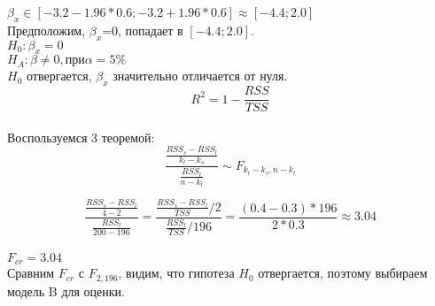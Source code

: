 \documentclass[12pt]{article} %
\theoremstyle{definition} %
\begin{document}
$\beta_x \in [-3.2 - 1.96*0.6; -3.2 + 1.96*0.6] \approx [-4.4;2.0]$\\
Предположим, $\beta_x$=0, попадает в $[-4.4;2.0]$.\\
$H_0:\beta_x=0$\\
$H_A:\beta \neq 0, при \alpha=5\%$\\
$H_0$ отвергается, $\beta_x$ значительно отличается от нуля.\\
$$R^2=1-\frac{RSS}{TSS}$$\\
Воспользуемся 3 теоремой:\\
$$ \frac{\frac{{RSS}_s-RSS_l}{k_l-k_s}}  {\frac{RSS_l}{n-k_l}} \sim F_{k_l-k_s,n-k_l}$$

$$ \frac{\frac{{RSS}_s-RSS_l}{4-2}}  {\frac{RSS_l}{200-196}}=\frac{\frac{{RSS}_s-RSS_l}{TSS}/2}  {\frac{RSS_l}{TSS}/196}=
\frac{(0.4-0.3)*196}{2*0.3} \approx 3.04$$\\
$F_{cr} = 3.04$\\
Сравним $F_{cr}$ с $F_{2,196}$, видим, что гипотеза $H_0$ отвергается, поэтому выбираем модель B для оценки.
\end{document}
